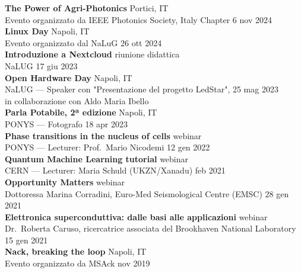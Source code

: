 \documentclass[a4paper]{article}
\begin{document}
\textbf{The Power of Agri-Photonics} \hfill Portici, IT \\
Evento organizzato da IEEE Photonics Society, Italy Chapter \hfill 6 nov 2024 \\
\vspace*{2mm}
\textbf{Linux Day} \hfill Napoli, IT \\
Evento organizzato dal NaLuG \hfill 26 ott 2024 \\
\vspace*{2mm}
\textbf{Introduzione a Nextcloud} \hfill riunione didattica \\
NaLUG \hfill 17 giu 2023 \\
\vspace*{2mm}
\textbf{Open Hardware Day} \hfill Napoli, IT \\
NaLUG --- Speaker con "Presentazione del progetto LedStar", \hfill 25 mag 2023 \\
in collaborazione con Aldo Maria Ibello \\
\vspace*{2mm}
\textbf{Parla Potabile, 2ª edizione} \hfill Napoli, IT \\
PONYS --- Fotografo \hfill 18 apr 2023 \\
\vspace*{2mm}
\textbf{Phase transitions in the nucleus of cells} \hfill webinar \\
PONYS --- Lecturer: Prof.\ Mario Nicodemi \hfill 12 gen 2022\\
\vspace*{2mm}
\textbf{Quantum Machine Learning tutorial} \hfill webinar\\
CERN --- Lecturer: Maria Schuld (UKZN/Xanadu) \hfill feb 2021\\
\vspace*{2mm}
\textbf{Opportunity Matters} \hfill webinar \\
Dottoressa Marina Corradini,
Euro-Med Seismological Centre (EMSC)
\hfill 28 gen 2021 \\
\vspace*{2mm}
\textbf{Elettronica superconduttiva: dalle basi alle applicazioni}
\hfill webinar \\
Dr.\ Roberta Caruso, ricercatrice associata del Brookhaven National Laboratory
\hfill 15 gen 2021 \\
\vspace*{2mm}
\textbf{Nack, breaking the loop} \hfill Napoli, IT \\
Evento organizzato da MSAck \hfill nov 2019 \\
\vspace*{2mm}
\end{document}
